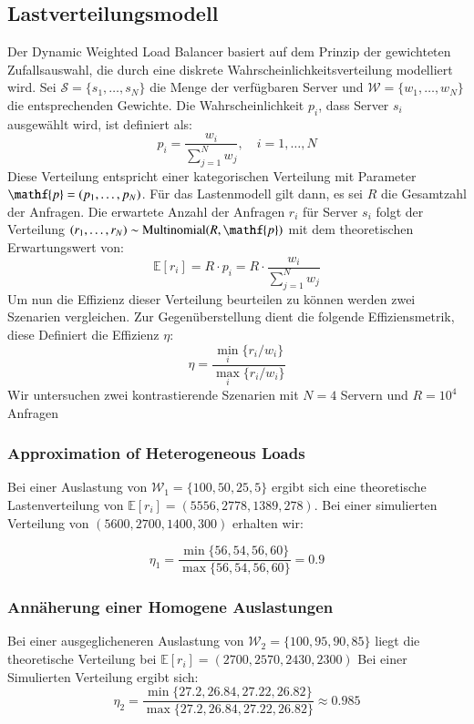 \documentclass[twocolumn]{webofc}
\begin{document}
\subsection{Lastverteilungsmodell}
Der Dynamic Weighted Load Balancer basiert auf dem Prinzip der gewichteten Zufallsauswahl, die durch eine diskrete Wahrscheinlichkeitsverteilung modelliert wird. Sei \( \mathcal{S} = \{s_1, \ldots, s_N\} \) die Menge der verfügbaren Server und \( \mathcal{W} = \{w_1, \ldots, w_N\} \) die entsprechenden Gewichte. Die Wahrscheinlichkeit \(  p_i \), dass Server \( s_i \) ausgewählt wird, ist definiert als:
$$
p_i = \frac{w_i}{\sum_{j=1}^N w_j}, \quad i = 1, \ldots, N
$$
Diese Verteilung entspricht einer kategorischen Verteilung mit Parameter \(\mathf{p} = (p_1, \ldots, p_N)\). Für das Lastenmodell gilt dann, es sei \(R\) die Gesamtzahl der Anfragen. Die erwartete Anzahl der Anfragen \(r_i\) für Server \(s_i\) folgt der Verteilung \( (r_1, \ldots, r_N) \sim \text{Multinomial}(R, \mathf{p}) \) mit dem theoretischen Erwartungswert von:
$$
\mathbb{E}[r_i] = R \cdot p_i = R \cdot \frac{w_i}{\sum_{j=1}^N w_j}
$$
Um nun die Effizienz dieser Verteilung beurteilen zu können werden zwei Szenarien vergleichen. Zur Gegenüberstellung dient die folgende Effiziensmetrik, diese Definiert die Effizienz \(\eta\):
$$
\eta = \frac{\min_{i} \{r_i / w_i\}}{\max_{i} \{r_i / w_i\}}
$$
Wir untersuchen zwei kontrastierende Szenarien mit \(N = 4\) Servern und \(R = 10^4\) Anfragen

\subsubsection{Approximation of Heterogeneous Loads}
Bei einer Auslastung von \(\mathcal{W}_1 = \{100, 50, 25, 5\}\) ergibt sich eine theoretische Lastenverteilung von \( \mathbb{E}[r_i] = (5556, 2778, 1389, 278)\). Bei einer simulierten Verteilung von \((5600, 2700, 1400, 300)\) erhalten wir: 

$$\eta_1 = \frac{\min \{56, 54, 56, 60\}}{\max \{56, 54, 56, 60\}} = 0.9$$

\subsubsection{Annäherung einer Homogene Auslastungen}
Bei einer ausgeglicheneren Auslastung von \(\mathcal{W}_2 = \{100, 95, 90, 85\}\) liegt die theoretische Verteilung bei \(\mathbb{E}[r_i] = (2700, 2570, 2430, 2300)\) Bei einer Simulierten Verteilung ergibt sich:
$$
\eta_2 = \frac{\min \{27.2, 26.84, 27.22, 26.82\}}{\max \{27.2, 26.84, 27.22, 26.82\}} \approx 0.985
$$
\end{document}
